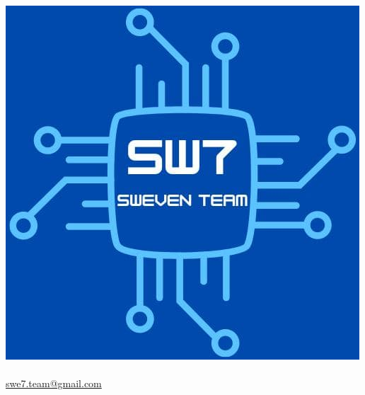 \documentclass[12pt, a4paper,table]{article}
\title{\textsc{\docNome}}
\author{}
\date{}
\begin{document}
	\maketitle
	\vspace{-3em}
	\begin{center}
	\includegraphics[scale=0.50]{images/logo.jpg} \\
	\vspace{2em}
	\huge \textsc{\docNomeTeam}\\
	\normalsize \href{mailto:swe7.team@gmail.com}{swe7.team@gmail.com}\\
	\vspace{2em}
	\end{center}
    \vspace{3em}

	\thispagestyle{empty}   
	\tableofcontents
	\newpage
\end{document}

